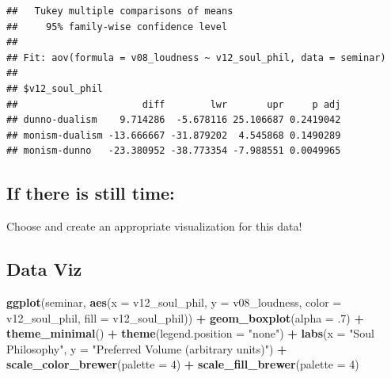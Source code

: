 \documentclass[
]{book}
\newenvironment{Shaded}{\begin{snugshade}}{\end{snugshade}}
\newcommand{\AttributeTok}[1]{\textcolor[rgb]{0.13,0.29,0.53}{#1}}
\newcommand{\DecValTok}[1]{\textcolor[rgb]{0.00,0.00,0.81}{#1}}
\newcommand{\FunctionTok}[1]{\textcolor[rgb]{0.13,0.29,0.53}{\textbf{#1}}}
\newcommand{\NormalTok}[1]{#1}
\newcommand{\SpecialCharTok}[1]{\textcolor[rgb]{0.81,0.36,0.00}{\textbf{#1}}}
\newcommand{\StringTok}[1]{\textcolor[rgb]{0.31,0.60,0.02}{#1}}
\begin{document}
\begin{verbatim}
##   Tukey multiple comparisons of means
##     95% family-wise confidence level
## 
## Fit: aov(formula = v08_loudness ~ v12_soul_phil, data = seminar)
## 
## $v12_soul_phil
##                      diff        lwr       upr     p adj
## dunno-dualism    9.714286  -5.678116 25.106687 0.2419042
## monism-dualism -13.666667 -31.879202  4.545868 0.1490289
## monism-dunno   -23.380952 -38.773354 -7.988551 0.0049965
\end{verbatim}

\subsection{\texorpdfstring{If there is still time: }{If there is still time: }}\label{if-there-is-still-time}

Choose and create an appropriate visualization for this data!

\subsection{\texorpdfstring{Data Viz }{Data Viz }}\label{data-viz}

\begin{Shaded}
\begin{Highlighting}[]
\FunctionTok{ggplot}\NormalTok{(seminar, }\FunctionTok{aes}\NormalTok{(}\AttributeTok{x =}\NormalTok{ v12\_soul\_phil, }\AttributeTok{y =}\NormalTok{ v08\_loudness, }
                    \AttributeTok{color =}\NormalTok{ v12\_soul\_phil, }\AttributeTok{fill =}\NormalTok{ v12\_soul\_phil)) }\SpecialCharTok{+}
  \FunctionTok{geom\_boxplot}\NormalTok{(}\AttributeTok{alpha =}\NormalTok{ .}\DecValTok{7}\NormalTok{) }\SpecialCharTok{+} \FunctionTok{theme\_minimal}\NormalTok{() }\SpecialCharTok{+} \FunctionTok{theme}\NormalTok{(}\AttributeTok{legend.position =} \StringTok{"none"}\NormalTok{) }\SpecialCharTok{+}
  \FunctionTok{labs}\NormalTok{(}\AttributeTok{x =} \StringTok{"Soul Philosophy"}\NormalTok{, }\AttributeTok{y =} \StringTok{"Preferred Volume (arbitrary units)"}\NormalTok{) }\SpecialCharTok{+}
  \FunctionTok{scale\_color\_brewer}\NormalTok{(}\AttributeTok{palette =} \DecValTok{4}\NormalTok{) }\SpecialCharTok{+} \FunctionTok{scale\_fill\_brewer}\NormalTok{(}\AttributeTok{palette =} \DecValTok{4}\NormalTok{)}
\end{Highlighting}
\end{Shaded}
\end{document}
